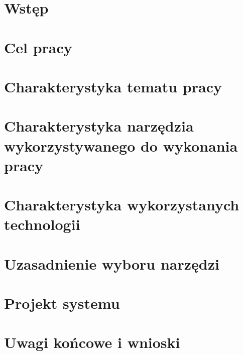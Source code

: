 \documentclass[a4paper,12pt]{report}
\begin{document}
\pagestyle{fancy}
\lhead{\thepage}
\cfoot{\ }
\lfoot{\thepage}

\tableofcontents
\newpage

\chapter*{Wstęp} \label{roz:rozdzial_1}
	\thispagestyle{empty}
	
	\newpage
	
\chapter{Cel pracy} \label{roz:rozdzial_2}
	\thispagestyle{empty}
	
	\newpage
\chapter{Charakterystyka tematu pracy} \label{roz:rozdzial_3}
	\thispagestyle{empty}
	
	\newpage
\chapter{Charakterystyka narzędzia wykorzystywanego do wykonania pracy} \label{roz:rozdzial_4}
	\thispagestyle{empty}
	
	\newpage
\chapter{Charakterystyka wykorzystanych technologii} \label{roz:rozdzial_5}
	\thispagestyle{empty}
	
	\newpage
\chapter{Uzasadnienie wyboru narzędzi} \label{roz:rozdzial_6}
	\thispagestyle{empty}
	
	\newpage
\chapter{Projekt systemu} \label{roz:rozdzial_7}
	\thispagestyle{empty}
	
	\newpage
\chapter{Uwagi końcowe i wnioski} \label{roz:rozdzial_8}
	\thispagestyle{empty}
	
	\newpage
\end{document}
